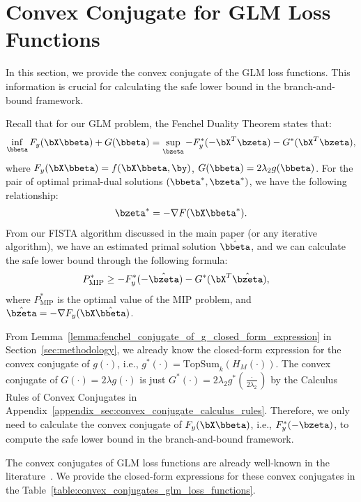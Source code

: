 \section{Convex Conjugate for GLM Loss Functions}
\label{appendix_sec:convex_conjugate_for_GLM_loss_functions}



In this section, we provide the convex conjugate of the GLM loss functions.
This information is crucial for calculating the safe lower bound in the branch-and-bound framework.

Recall that for our GLM problem, the Fenchel Duality Theorem states that:
\begin{align}
    \label{appendix_eq:fenchel_duality_theorem}
    \inf_{\bbeta} F_y(\bX \bbeta) + G(\bbeta) = \sup_{\bzeta} -F_y^*(-\bX^T \bzeta) - G^*(\bX^T \bzeta),
\end{align}
where $F_y(\bX \bbeta) = f(\bX \bbeta, \by)$, $G(\bbeta) = 2 \lambda_2 g(\bbeta)$.
For the pair of optimal primal-dual solutions $(\bbeta^*, \bzeta^*)$, we have the following relationship:
\begin{align}
    \label{appendix_eq:fenchel_duality_optimality_condition}
    \bzeta^*  = - \nabla F(\bX \bbeta^*). 
\end{align}
From our FISTA algorithm discussed in the main paper (or any iterative algorithm), we have an estimated primal solution $\hat{\bbeta}$, and we can calculate the safe lower bound through the following formula:
\begin{align}
    \label{appendix_eq:dual_bound_via_fenchel_duality_theorem}
    P^*_{\text{MIP}} & \geq -F_y^*(-\hat{\bzeta}) - G^*(\bX^T \hat{\bzeta}),
\end{align}
where $P^*_{\text{MIP}}$ is the optimal value of the MIP problem, and $\hat{\bzeta} = -\nabla F_y(\bX \hat{\bbeta})$. 

From Lemma~\ref{lemma:fenchel_conjugate_of_g_closed_form_expression} in Section~\ref{sec:methodology}, we already know the closed-form expression for the convex conjugate of $g(\cdot)$, i.e., $g^*(\cdot) = \text{TopSum}_k(H_M(\cdot))$.
The convex conjugate of $G(\cdot)=2\lambda g(\cdot)$ is just $G^*(\cdot) = 2\lambda_2 g^*(\frac{\cdot}{2\lambda_2})$ by the Calculus Rules of Convex Conjugates in Appendix~\ref{appendix_sec:convex_conjugate_calculus_rules}.
Therefore, we only need to calculate the convex conjugate of $F_y(\bX \bbeta)$, i.e., $F_y^*(-\bzeta)$, to compute the safe lower bound in the branch-and-bound framework.

The convex conjugates of GLM loss functions are already well-known in the literature~\cite{}.
We provide the closed-form expressions for these convex conjugates in the Table~\ref{table:convex_conjugates_glm_loss_functions}.
